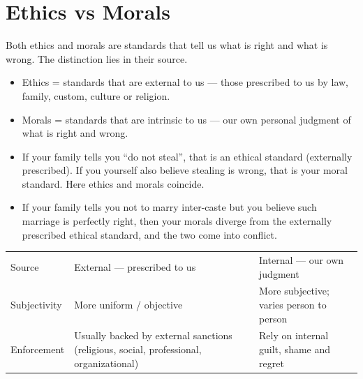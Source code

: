 \section{Ethics vs Morals}

Both ethics and morals are standards that tell us what is right and what is wrong. The distinction lies in their source.

\begin{KeyConcept}
\begin{itemize}
\item Ethics = standards that are external to us --- those prescribed to us by law, family, custom, culture or religion.
\item Morals = standards that are intrinsic to us --- our own personal judgment of what is right and wrong.
\end{itemize}
\end{KeyConcept}

\begin{ExampleBox}
\begin{itemize}
\item If your family tells you ``do not steal'', that is an ethical standard (externally prescribed). If you yourself also believe stealing is wrong, that is your moral standard. Here ethics and morals coincide.
\item If your family tells you not to marry inter-caste but you believe such marriage is perfectly right, then your morals diverge from the externally prescribed ethical standard, and the two come into conflict.
\end{itemize}
\end{ExampleBox}

\begin{center}
\begin{tabularx}{\textwidth}{>{\raggedright\arraybackslash}p{2.6cm} Y Y}
 &  &  \\
\toprule
Source & External --- prescribed to us & Internal --- our own judgment \\
Subjectivity & More uniform / objective & More subjective; varies person to person \\
Enforcement & Usually backed by external sanctions (religious, social, professional, organizational) & Rely on internal guilt, shame and regret \\
\bottomrule
\end{tabularx}
\end{center}

